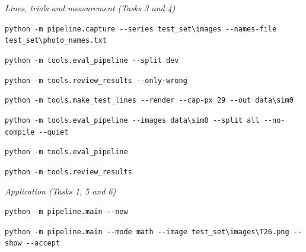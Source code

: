 \medskip\noindent\textit{Lines, trials and measurement (Tasks 3 and 4)}\par\nopagebreak\smallskip
\noindent\lstinline[style=sumlist]|python -m pipeline.capture --series test_set\images --names-file test_set\photo_names.txt|\\
\hspace*{1.2em}{\small Photograph the 80 lines}\par\smallskip
\noindent\lstinline[style=sumlist]|python -m tools.eval_pipeline --split dev|\\
\hspace*{1.2em}{\small Evaluate the 20 development lines}\par\smallskip
\noindent\lstinline[style=sumlist]|python -m tools.review_results --only-wrong|\\
\hspace*{1.2em}{\small Review document of the lines misread in the latest evaluation}\par\smallskip
\noindent\lstinline[style=sumlist]|python -m tools.make_test_lines --render --cap-px 29 --out data\sim0|\\
\hspace*{1.2em}{\small Simulated photographs at the calibrated size}\par\smallskip
\noindent\lstinline[style=sumlist]|python -m tools.eval_pipeline --images data\sim0 --split all --no-compile --quiet|\\
\hspace*{1.2em}{\small Evaluate a set of simulated photographs}\par\smallskip
\noindent\lstinline[style=sumlist]|python -m tools.eval_pipeline|\\
\hspace*{1.2em}{\small Evaluate the 60 test lines (at the gate and for the final measurement only)}\par\smallskip
\noindent\lstinline[style=sumlist]|python -m tools.review_results|\\
\hspace*{1.2em}{\small Review document of all lines of the latest evaluation}\par\smallskip

\medskip\noindent\textit{Application (Tasks 1, 5 and 6)}\par\nopagebreak\smallskip
\noindent\lstinline[style=sumlist]|python -m pipeline.main --new|\\
\hspace*{1.2em}{\small The application with the board, in a new session}\par\smallskip
\noindent\lstinline[style=sumlist]|python -m pipeline.main --mode math --image test_set\images\T26.png --show --accept|\\
\hspace*{1.2em}{\small Read a stored photograph and accept its line}\par\smallskip

